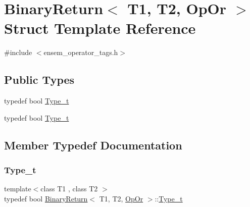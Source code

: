 \hypertarget{structBinaryReturn_3_01T1_00_01T2_00_01OpOr_01_4}{}\section{Binary\+Return$<$ T1, T2, Op\+Or $>$ Struct Template Reference}
\label{structBinaryReturn_3_01T1_00_01T2_00_01OpOr_01_4}


{\ttfamily \#include $<$ensem\+\_\+operator\+\_\+tags.\+h$>$}

\subsection*{Public Types}
\begin{DoxyCompactItemize}
\item 
typedef bool \mbox{\hyperlink{structBinaryReturn_3_01T1_00_01T2_00_01OpOr_01_4_a1680bdb61ac9ebe2b2be3fb7de1329b4}{Type\+\_\+t}}
\item 
typedef bool \mbox{\hyperlink{structBinaryReturn_3_01T1_00_01T2_00_01OpOr_01_4_a1680bdb61ac9ebe2b2be3fb7de1329b4}{Type\+\_\+t}}
\end{DoxyCompactItemize}


\subsection{Member Typedef Documentation}
\mbox{\label{structBinaryReturn_3_01T1_00_01T2_00_01OpOr_01_4_a1680bdb61ac9ebe2b2be3fb7de1329b4}} 
\subsubsection{\texorpdfstring{Type\_t}{Type\_t}\hspace{0.1cm}{\footnotesize\ttfamily [1/2]}}
{\footnotesize\ttfamily template$<$class T1 , class T2 $>$ \\
typedef bool \mbox{\hyperlink{structBinaryReturn}{Binary\+Return}}$<$ T1, T2, \mbox{\hyperlink{structOpOr}{Op\+Or}} $>$\+::\mbox{\hyperlink{structBinaryReturn_3_01T1_00_01T2_00_01OpOr_01_4_a1680bdb61ac9ebe2b2be3fb7de1329b4}{Type\+\_\+t}}}

\mbox{\label{structBinaryReturn_3_01T1_00_01T2_00_01OpOr_01_4_a1680bdb61ac9ebe2b2be3fb7de1329b4}} 
